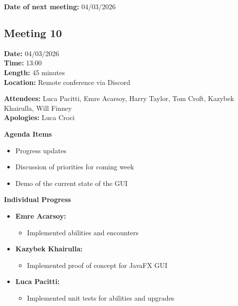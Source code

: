 \documentclass[11pt]{article}
\begin{document}
    \textbf{Date of next meeting:} 04/03/2026

    \vspace{1.5\baselineskip}
    \subsection{Meeting 10}

    \textbf{Date:} 04/03/2026 \\
    \textbf{Time:} 13:00 \\
    \textbf{Length:} 45 minutes \\
    \textbf{Location:} Remote conference via Discord

    \textbf{Attendees:} Luca Pacitti, Emre Acarsoy, Harry Taylor, Tom Croft, Kazybek Khairulla, Will Finney \\
    \textbf{Apologies:} Luca Croci

    \textbf{Agenda Items}
    \begin{itemize}
        \item Progress updates
        \item Discussion of priorities for coming week
        \item Demo of the current state of the GUI
    \end{itemize}

    \textbf{Individual Progress}
    \begin{itemize}
        \item \textbf{Emre Acarsoy:}
        \begin{itemize}
            \item Implemented abilities and encounters
        \end{itemize}

        \item \textbf{Kazybek Khairulla:}
        \begin{itemize}
            \item Implemented proof of concept for JavaFX GUI
        \end{itemize}

        \item \textbf{Luca Pacitti:}
        \begin{itemize}
            \item Implemented unit tests for abilities and upgrades
        \end{itemize}
    \end{itemize}
\end{document}

